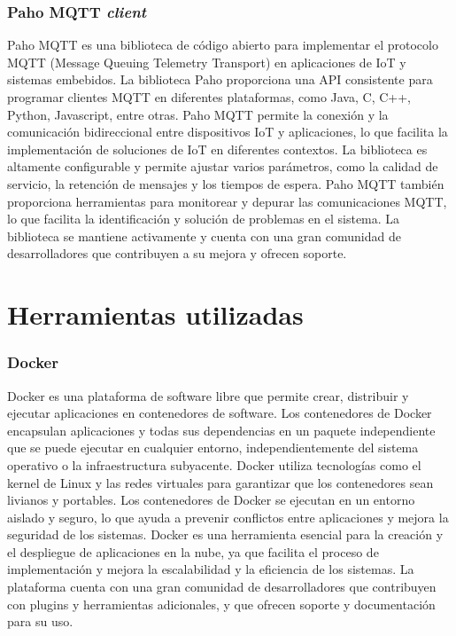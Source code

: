 \subsubsection{Paho MQTT \textit{client}}

 Paho MQTT es una biblioteca de código abierto para implementar el protocolo MQTT (Message Queuing Telemetry Transport) en aplicaciones de IoT y sistemas embebidos. La biblioteca Paho proporciona una API consistente para programar clientes MQTT en diferentes plataformas, como Java, C, C++, Python, Javascript, entre otras. Paho MQTT permite la conexión y la comunicación bidireccional entre dispositivos IoT y aplicaciones, lo que facilita la implementación de soluciones de IoT en diferentes contextos. La biblioteca es altamente configurable y permite ajustar varios parámetros, como la calidad de servicio, la retención de mensajes y los tiempos de espera. Paho MQTT también proporciona herramientas para monitorear y depurar las comunicaciones MQTT, lo que facilita la identificación y solución de problemas en el sistema. La biblioteca se mantiene activamente y cuenta con una gran comunidad de desarrolladores que contribuyen a su mejora y ofrecen soporte.


\section{Herramientas utilizadas}


\subsubsection{Docker}

Docker es una plataforma de software libre que permite crear, distribuir y ejecutar aplicaciones en contenedores de software. Los contenedores de Docker encapsulan aplicaciones y todas sus dependencias en un paquete independiente que se puede ejecutar en cualquier entorno, independientemente del sistema operativo o la infraestructura subyacente. Docker utiliza tecnologías como el kernel de Linux y las redes virtuales para garantizar que los contenedores sean livianos y portables. Los contenedores de Docker se ejecutan en un entorno aislado y seguro, lo que ayuda a prevenir conflictos entre aplicaciones y mejora la seguridad de los sistemas. Docker es una herramienta esencial para la creación y el despliegue de aplicaciones en la nube, ya que facilita el proceso de implementación y mejora la escalabilidad y la eficiencia de los sistemas. La plataforma cuenta con una gran comunidad de desarrolladores que contribuyen con plugins y herramientas adicionales, y que ofrecen soporte y documentación para su uso.

